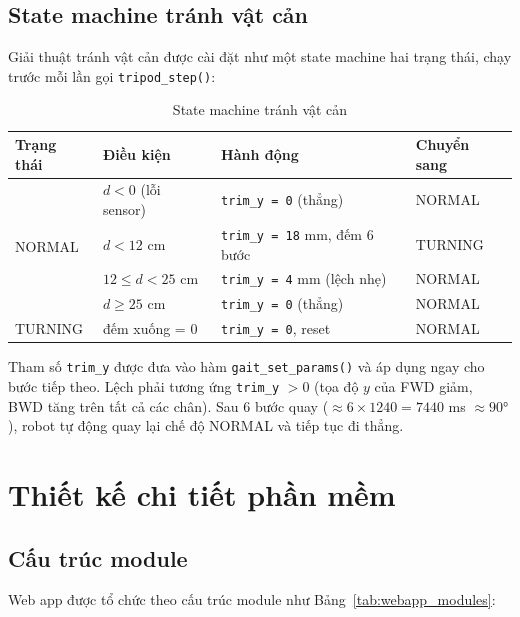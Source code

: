         \subsection{State machine tránh vật cản}

        \hspace{0.5cm} Giải thuật tránh vật cản được cài đặt như một state machine hai trạng thái, chạy trước mỗi lần gọi \texttt{tripod\_step()}:

        \begin{table}[H]
        \centering
        \caption{State machine tránh vật cản}
        \label{tab:obs_sm}
        \begin{tabular}{|l|l|l|l|}
        \hline
        \textbf{Trạng thái} & \textbf{Điều kiện} & \textbf{Hành động} & \textbf{Chuyển sang} \\
        \hline
        \multirow{4}{*}{NORMAL} & $d < 0$ (lỗi sensor) & \texttt{trim\_y = 0} (thẳng) & NORMAL \\
        & $d < 12$ cm & \texttt{trim\_y = 18} mm, đếm 6 bước & TURNING \\
        & $12 \leq d < 25$ cm & \texttt{trim\_y = 4} mm (lệch nhẹ) & NORMAL \\
        & $d \geq 25$ cm & \texttt{trim\_y = 0} (thẳng) & NORMAL \\
        \hline
        TURNING & đếm xuống = 0 & \texttt{trim\_y = 0}, reset & NORMAL \\
        \hline
        \end{tabular}
        \end{table}

        Tham số \texttt{trim\_y} được đưa vào hàm \texttt{gait\_set\_params()} và áp dụng ngay cho bước tiếp theo. Lệch phải tương ứng \texttt{trim\_y} $> 0$ (tọa độ $y$ của FWD giảm, BWD tăng trên tất cả các chân). Sau 6 bước quay ($\approx 6 \times 1240 = 7440$ ms $\approx 90°$), robot tự động quay lại chế độ NORMAL và tiếp tục đi thẳng.

    \section{Thiết kế chi tiết phần mềm}

        \subsection{Cấu trúc module}

        \hspace{0.5cm} Web app được tổ chức theo cấu trúc module như Bảng~\ref{tab:webapp_modules}:

